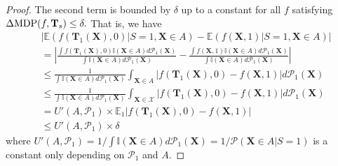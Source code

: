 \documentclass[10pt]{article} %
\begin{document}
\begin{proof}
    The second term is bounded by $\delta$ up to a constant for all $f$ satisfying $\Delta \textup{MDP}(f, \mathbf{T}_{s}) \le \delta.$
    That is, we have
    \begin{equation}
        \begin{split}
            & \vert \mathbb{E} ( f( \mathbf{T}_{1}(\mathbf{X}), 0 ) | S = 1, \mathbf{X} \in A ) - \mathbb{E} ( f( \mathbf{X}, 1 ) | S = 1, \mathbf{X} \in A ) \vert 
            \\ 
            & = \left\vert 
            \frac{ \int f ( \mathbf{T}_{1}( \mathbf{X} ), 0 ) \mathbb{I}(\mathbf{X} \in A) d\mathcal{P}_{1}(\mathbf{X}) }{ \int \mathbb{I}( \mathbf{X} \in A ) d\mathcal{P}_{1}(\mathbf{X}) }
            -
            \frac{ \int f ( \mathbf{X} , 1 ) \mathbb{I}(\mathbf{X} \in A) d\mathcal{P}_{1}(\mathbf{X}) }{ \int \mathbb{I}( \mathbf{X} \in A ) d\mathcal{P}_{1} (\mathbf{X}) }
            \right\vert 
            \\ 
            & \le 
            \frac{1}{ \int \mathbb{I}( \mathbf{X} \in A ) d\mathcal{P}_{1}(\mathbf{X}) } \int_{\mathbf{X} \in A} \vert f( \mathbf{T}_{1}(\mathbf{X}), 0 ) - f( \mathbf{X}, 1 ) \vert d\mathcal{P}_{1}(\mathbf{X})
            \\ 
            & \le 
            \frac{1}{ \int \mathbb{I}( \mathbf{X} \in A ) d\mathcal{P}_{1}(\mathbf{X}) } \int_{\mathbf{X} \in \mathcal{X}} \vert f( \mathbf{T}_{1}(\mathbf{X}), 0 ) - f( \mathbf{X}, 1 ) \vert d\mathcal{P}_{1}(\mathbf{X})
            \\ 
            & = U'(A, \mathcal{P}_{1}) \times \mathbb{E}_{1} \vert f( \mathbf{T}_{1}(\mathbf{X}), 0 ) - f( \mathbf{X}, 1 ) \vert
            \\
            & \le U'(A, \mathcal{P}_{1}) \times \delta
        \end{split}
    \end{equation}
    where $U'(A, \mathcal{P}_{1}) = 1 / \int \mathbb{I}( \mathbf{X} \in A ) d\mathcal{P}_{1}(\mathbf{X}) = 1 / \mathcal{P} (\mathbf{X} \in A | S = 1)$ is a constant only depending on $\mathcal{P}_{1}$ and $A.$ 


\end{proof}
\end{document}
